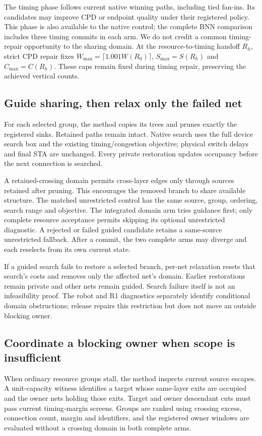 \documentclass[conference,10pt]{IEEEtran}
\begin{document}
The timing phase follows current native winning paths, including tied fan-ins. Its candidates may improve CPD or endpoint quality under their registered policy. This phase is also available to the native control; the complete BNN comparison includes three timing commits in each arm. We do not credit a common timing-repair opportunity to the sharing domain. At the resource-to-timing handoff $R_h$, strict CPD repair fixes $W_{\max}=\lceil1.001W(R_0)\rceil$, $S_{\max}=S(R_h)$ and $C_{\max}=C(R_h)$. These caps remain fixed during timing repair, preserving the achieved vertical counts.

\subsection{Guide sharing, then relax only the failed net}
For each selected group, the method copies its trees and prunes exactly the registered sinks. Retained paths remain intact. Native search uses the full device search box and the existing timing/congestion objective; physical switch delays and final STA are unchanged. Every private restoration updates occupancy before the next connection is searched.

A retained-crossing domain permits cross-layer edges only through sources retained after pruning. This encourages the removed branch to share available structure. The matched unrestricted control has the same source, group, ordering, search range and objective. The integrated domain arm tries guidance first; only complete resource acceptance permits skipping its optional unrestricted diagnostic. A rejected or failed guided candidate retains a same-source unrestricted fallback. After a commit, the two complete arms may diverge and each reselects from its own current state.

If a guided search fails to restore a selected branch, per-net relaxation resets that search's costs and removes only the affected net's domain. Earlier restorations remain private and other nets remain guided. Search failure itself is not an infeasibility proof. The robot and R1 diagnostics separately identify conditional domain obstructions; release repairs this restriction but does not move an outside blocking owner.

\subsection{Coordinate a blocking owner when scope is insufficient}
When ordinary resource groups stall, the method inspects current source escapes. A unit-capacity witness identifies a target whose same-layer exits are occupied and the owner nets holding those exits. Target and owner descendant cuts must pass current timing-margin screens. Groups are ranked using crossing excess, connection count, margin and identifiers, and the registered owner windows are evaluated without a crossing domain in both complete arms.
\end{document}
